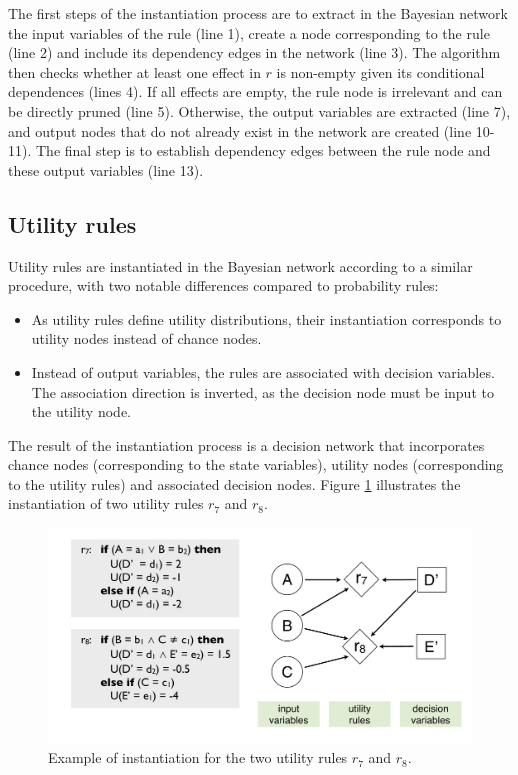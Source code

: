 The first steps of the instantiation process are to extract in the Bayesian network the input variables of the rule (line 1), create a node corresponding to the rule (line 2) and include its dependency edges in the network (line 3).  The algorithm then checks whether at least one effect in $r$ is non-empty given its conditional dependences (lines 4).  If all effects are empty, the rule node is irrelevant and can be directly pruned (line 5). Otherwise, the output variables are extracted (line 7), and output nodes that do not already exist in the network are created (line 10-11). The final step is to establish dependency edges between the rule node and these output variables (line 13).


\subsection{Utility rules}

Utility rules are instantiated in the Bayesian network according to a similar procedure, with two notable differences compared to probability rules: \begin{itemize}
\item As utility rules define utility distributions, their instantiation corresponds to utility nodes instead of chance nodes.
\item Instead of output variables, the rules are associated with decision variables.  The association direction is inverted, as the decision node must be input to the utility node.
\end{itemize} 

The result of the instantiation process is a decision network that incorporates chance nodes (corresponding to the state variables), utility nodes (corresponding to the utility rules) and associated decision nodes. Figure \ref{fig:instantitionutil} illustrates the instantiation of two utility rules $r_7$ and $r_8$. 

\begin{figure}[ht]
\centering
\includegraphics[scale=0.25]{imgs/ruleinstantiation2.pdf}
\caption{Example of instantiation for the two utility rules $r_7$ and $r_8$.}
\label{fig:instantitionutil}
\end{figure}

